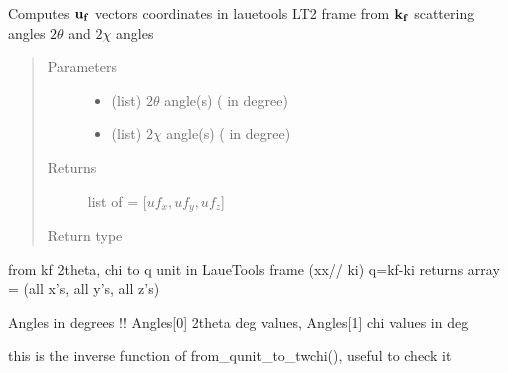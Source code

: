 \documentclass[letterpaper,10pt,english]{sphinxmanual}
\begin{document}
\begin{fulllineitems}
\label{\detokenize{Simulation_Module:LaueTools.LaueGeometry.uflab_from2thetachi}}
Computes \({\bf u_f}\) vectors coordinates in lauetools LT2 frame
from \({\bf k_f}\) scattering angles \(2 \theta\) and \(2 \chi\) angles
\begin{quote}\begin{description}
\item[{Parameters}] \leavevmode\begin{itemize}
\item {} 
 \textendash{} (list) \(2 \theta\) angle(s) ( in degree)

\item {} 
 \textendash{} (list) \(2 \chi\) angle(s) ( in degree)

\end{itemize}

\item[{Returns}] \leavevmode
list of  =  {[}\(uf_x,uf_y,uf_z\){]}

\item[{Return type}] \leavevmode
{}

\end{description}\end{quote}

\end{fulllineitems}


\begin{fulllineitems}
\label{\detokenize{Simulation_Module:LaueTools.LaueGeometry.from_twchi_to_qunit}}
from kf 2theta, chi to q unit in LaueTools frame (xx// ki) q=kf-ki
returns array = (all x’s, all y’s, all z’s)

Angles in degrees !!
Angles{[}0{]} 2theta deg values,
Angles{[}1{]} chi values in deg

this is the inverse function of from\_qunit\_to\_twchi(), useful to check it

\end{fulllineitems}
\end{document}
